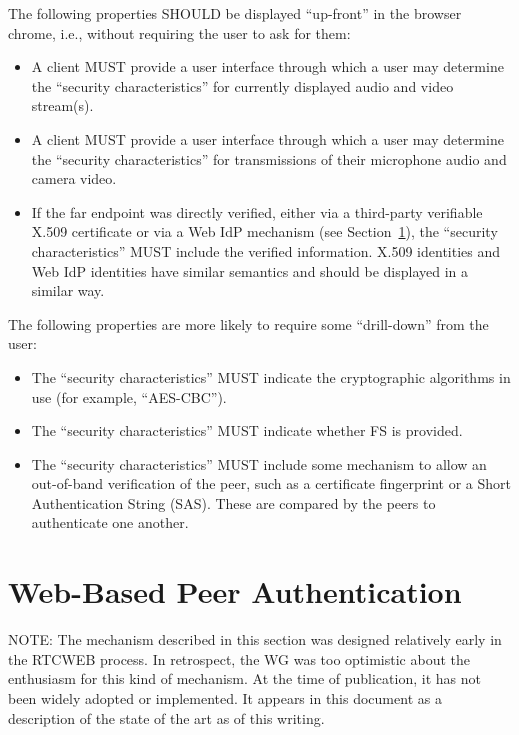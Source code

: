 \documentclass{article}
\begin{document}
The following properties SHOULD be displayed ``up-front'' in the
browser chrome, i.e., without requiring the user to ask for them:

\begin{itemize}
\item A client MUST provide a user interface through which a user may
  determine the ``security characteristics'' for currently
  displayed audio and video stream(s).

\item A client MUST provide a user interface through which a user may
  determine the ``security characteristics'' for transmissions of
  their microphone audio and camera video.

\item If the far endpoint was directly verified, either via a third-party verifiable X.509 certificate or via a Web IdP mechanism
  (see Section~\ref{sec:web-based-peer-auth}), the ``security characteristics'' MUST include
  the verified information.  X.509 identities and Web IdP
  identities have similar semantics and should be displayed in a
  similar way.
\end{itemize}

The following properties are more likely to require some ``drill-down'' from the user:

\begin{itemize}
\item The ``security characteristics'' MUST indicate the cryptographic
  algorithms in use (for example, ``AES-CBC'').

\item The ``security characteristics'' MUST indicate whether FS is
  provided.

\item The ``security characteristics'' MUST include some mechanism to
  allow an out-of-band verification of the peer, such as a
  certificate fingerprint or a Short Authentication String (SAS).
  These are compared by the peers to authenticate one another.
\end{itemize}

\section{Web-Based Peer Authentication}
\label{sec:web-based-peer-auth}

NOTE: The mechanism described in this section was designed relatively
early in the RTCWEB process.  In retrospect, the WG was too
optimistic about the enthusiasm for this kind of mechanism.  At the
time of publication, it has not been widely adopted or implemented.
It appears in this document as a description of the state of the art
as of this writing.
\end{document}
